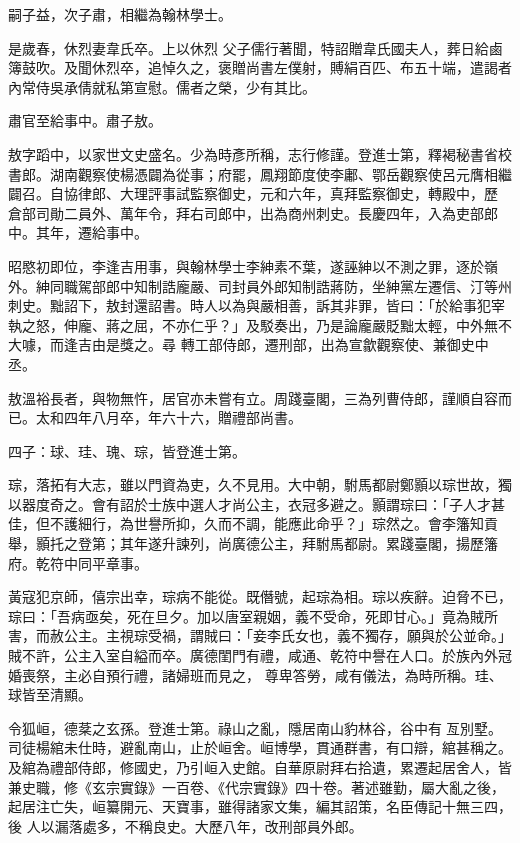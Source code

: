 \begin{pinyinscope}
 嗣子益，次子肅，相繼為翰林學士。



 是歲春，休烈妻韋氏卒。上以休烈
 父子儒行著聞，特詔贈韋氏國夫人，葬日給鹵簿鼓吹。及聞休烈卒，追悼久之，褒贈尚書左僕射，賻絹百匹、布五十端，遣謁者內常侍吳承倩就私第宣慰。儒者之榮，少有其比。



 肅官至給事中。肅子敖。



 敖字蹈中，以家世文史盛名。少為時彥所稱，志行修謹。登進士第，釋褐秘書省校書郎。湖南觀察使楊憑闢為從事；府罷，鳳翔節度使李鄘、鄂岳觀察使呂元膺相繼闢召。自協律郎、大理評事試監察御史，元和六年，真拜監察御史，轉殿中，歷
 倉部司勛二員外、萬年令，拜右司郎中，出為商州刺史。長慶四年，入為吏部郎中。其年，遷給事中。



 昭愍初即位，李逢吉用事，與翰林學士李紳素不葉，遂誣紳以不測之罪，逐於嶺外。紳同職駕部郎中知制誥龐嚴、司封員外郎知制誥蔣防，坐紳黨左遷信、汀等州刺史。黜詔下，敖封還詔書。時人以為與嚴相善，訴其非罪，皆曰：「於給事犯宰執之怒，伸龐、蔣之屈，不亦仁乎？」及駁奏出，乃是論龐嚴貶黜太輕，中外無不大噱，而逢吉由是獎之。尋
 轉工部侍郎，遷刑部，出為宣歙觀察使、兼御史中丞。



 敖溫裕長者，與物無忤，居官亦未嘗有立。周踐臺閣，三為列曹侍郎，謹順自容而已。太和四年八月卒，年六十六，贈禮部尚書。



 四子：球、珪、瑰、琮，皆登進士第。



 琮，落拓有大志，雖以門資為吏，久不見用。大中朝，駙馬都尉鄭顥以琮世故，獨以器度奇之。會有詔於士族中選人才尚公主，衣冠多避之。顥謂琮曰：「子人才甚佳，但不護細行，為世譽所抑，久而不調，能應此命乎？」琮然之。會李籓知貢
 舉，顥托之登第；其年遂升諫列，尚廣德公主，拜駙馬都尉。累踐臺閣，揚歷籓府。乾符中同平章事。



 黃寇犯京師，僖宗出幸，琮病不能從。既僭號，起琮為相。琮以疾辭。迫脅不已，琮曰：「吾病亟矣，死在旦夕。加以唐室親姻，義不受命，死即甘心。」竟為賊所害，而赦公主。主視琮受禍，謂賊曰：「妾李氏女也，義不獨存，願與於公並命。」賊不許，公主入室自縊而卒。廣德閨門有禮，咸通、乾符中譽在人口。於族內外冠婚喪祭，主必自預行禮，諸婦班而見之，
 尊卑答勞，咸有儀法，為時所稱。珪、球皆至清顯。



 令狐峘，德棻之玄孫。登進士第。祿山之亂，隱居南山豹林谷，谷中有亙別墅。司徒楊綰未仕時，避亂南山，止於峘舍。峘博學，貫通群書，有口辯，綰甚稱之。及綰為禮部侍郎，修國史，乃引峘入史館。自華原尉拜右拾遺，累遷起居舍人，皆兼史職，修《玄宗實錄》一百卷、《代宗實錄》四十卷。著述雖勤，屬大亂之後，起居注亡失，峘纂開元、天寶事，雖得諸家文集，編其詔策，名臣傳記十無三四，後
 人以漏落處多，不稱良史。大歷八年，改刑部員外郎。




\end{pinyinscope}
